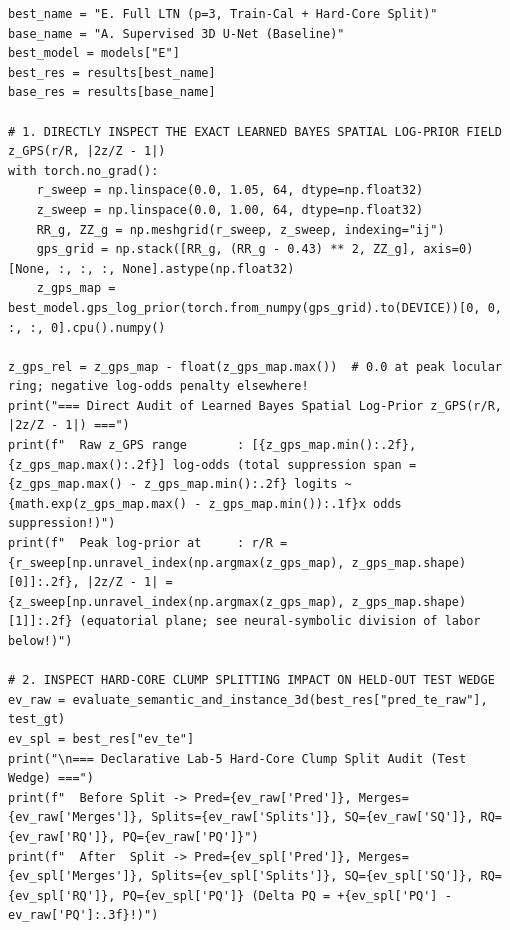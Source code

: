 \documentclass[10pt,a4paper]{article}
\begin{document}
\begin{codebox}
\begin{lstlisting}[style=pybmed]
best_name = "E. Full LTN (p=3, Train-Cal + Hard-Core Split)"
base_name = "A. Supervised 3D U-Net (Baseline)"
best_model = models["E"]
best_res = results[best_name]
base_res = results[base_name]

# 1. DIRECTLY INSPECT THE EXACT LEARNED BAYES SPATIAL LOG-PRIOR FIELD z_GPS(r/R, |2z/Z - 1|)
with torch.no_grad():
    r_sweep = np.linspace(0.0, 1.05, 64, dtype=np.float32)
    z_sweep = np.linspace(0.0, 1.00, 64, dtype=np.float32)
    RR_g, ZZ_g = np.meshgrid(r_sweep, z_sweep, indexing="ij")
    gps_grid = np.stack([RR_g, (RR_g - 0.43) ** 2, ZZ_g], axis=0)[None, :, :, :, None].astype(np.float32)
    z_gps_map = best_model.gps_log_prior(torch.from_numpy(gps_grid).to(DEVICE))[0, 0, :, :, 0].cpu().numpy()

z_gps_rel = z_gps_map - float(z_gps_map.max())  # 0.0 at peak locular ring; negative log-odds penalty elsewhere!
print("=== Direct Audit of Learned Bayes Spatial Log-Prior z_GPS(r/R, |2z/Z - 1|) ===")
print(f"  Raw z_GPS range       : [{z_gps_map.min():.2f}, {z_gps_map.max():.2f}] log-odds (total suppression span = {z_gps_map.max() - z_gps_map.min():.2f} logits ~ {math.exp(z_gps_map.max() - z_gps_map.min()):.1f}x odds suppression!)")
print(f"  Peak log-prior at     : r/R = {r_sweep[np.unravel_index(np.argmax(z_gps_map), z_gps_map.shape)[0]]:.2f}, |2z/Z - 1| = {z_sweep[np.unravel_index(np.argmax(z_gps_map), z_gps_map.shape)[1]]:.2f} (equatorial plane; see neural-symbolic division of labor below!)")

# 2. INSPECT HARD-CORE CLUMP SPLITTING IMPACT ON HELD-OUT TEST WEDGE
ev_raw = evaluate_semantic_and_instance_3d(best_res["pred_te_raw"], test_gt)
ev_spl = best_res["ev_te"]
print("\n=== Declarative Lab-5 Hard-Core Clump Split Audit (Test Wedge) ===")
print(f"  Before Split -> Pred={ev_raw['Pred']}, Merges={ev_raw['Merges']}, Splits={ev_raw['Splits']}, SQ={ev_raw['SQ']}, RQ={ev_raw['RQ']}, PQ={ev_raw['PQ']}")
print(f"  After  Split -> Pred={ev_spl['Pred']}, Merges={ev_spl['Merges']}, Splits={ev_spl['Splits']}, SQ={ev_spl['SQ']}, RQ={ev_spl['RQ']}, PQ={ev_spl['PQ']} (Delta PQ = +{ev_spl['PQ'] - ev_raw['PQ']:.3f}!)")


\end{lstlisting}
\end{codebox}
\end{document}

